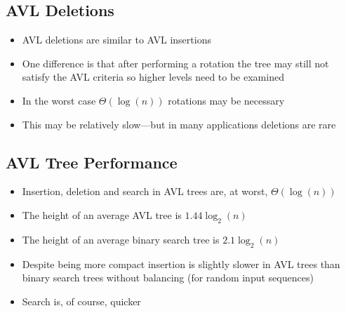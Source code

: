 
\begin{slide}
\section{AVL Deletions}

\begin{PauseHighLight}
  \begin{itemize}
  \item AVL deletions are similar to AVL insertions\pause
  \item One difference is that after performing a rotation the tree may
    still not satisfy the AVL criteria so higher levels need to be
    examined\pause
  \item In the worst case $\Theta(\log(n))$ rotations may be necessary\pause
  \item This may be relatively slow\pause---but in many applications
    deletions are rare\pause
  \end{itemize}
 \end{PauseHighLight}


\end{slide}



\begin{slide}
\section{AVL Tree Performance}

\begin{PauseHighLight}
  \begin{itemize}
  \item Insertion, deletion and search in AVL trees are, at worst,
    $\Theta(\log(n))$\pause
  \item The height of an average AVL tree is $1.44\log_2(n)$\pause
  \item The height of an average binary search tree is
    $2.1\log_2(n)$\pause
  \item Despite being more compact insertion is slightly slower in AVL
    trees than binary search trees without balancing (for random input
    sequences)\pause
  \item Search is, of course, quicker\pause
  \end{itemize}
\end{PauseHighLight}


\end{slide}


